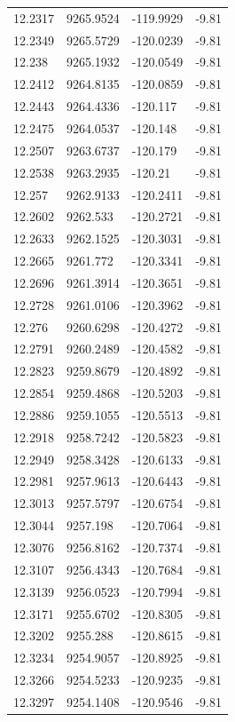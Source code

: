 \begin{table}[H]
\begin{tabular}{llll}
12.2317 & 9265.9524 & -119.9929 & -9.81 \\
12.2349 & 9265.5729 & -120.0239 & -9.81 \\
12.238 & 9265.1932 & -120.0549 & -9.81 \\
12.2412 & 9264.8135 & -120.0859 & -9.81 \\
12.2443 & 9264.4336 & -120.117 & -9.81 \\
12.2475 & 9264.0537 & -120.148 & -9.81 \\
12.2507 & 9263.6737 & -120.179 & -9.81 \\
12.2538 & 9263.2935 & -120.21 & -9.81 \\
12.257 & 9262.9133 & -120.2411 & -9.81 \\
12.2602 & 9262.533 & -120.2721 & -9.81 \\
12.2633 & 9262.1525 & -120.3031 & -9.81 \\
12.2665 & 9261.772 & -120.3341 & -9.81 \\
12.2696 & 9261.3914 & -120.3651 & -9.81 \\
12.2728 & 9261.0106 & -120.3962 & -9.81 \\
12.276 & 9260.6298 & -120.4272 & -9.81 \\
12.2791 & 9260.2489 & -120.4582 & -9.81 \\
12.2823 & 9259.8679 & -120.4892 & -9.81 \\
12.2854 & 9259.4868 & -120.5203 & -9.81 \\
12.2886 & 9259.1055 & -120.5513 & -9.81 \\
12.2918 & 9258.7242 & -120.5823 & -9.81 \\
12.2949 & 9258.3428 & -120.6133 & -9.81 \\
12.2981 & 9257.9613 & -120.6443 & -9.81 \\
12.3013 & 9257.5797 & -120.6754 & -9.81 \\
12.3044 & 9257.198 & -120.7064 & -9.81 \\
12.3076 & 9256.8162 & -120.7374 & -9.81 \\
12.3107 & 9256.4343 & -120.7684 & -9.81 \\
12.3139 & 9256.0523 & -120.7994 & -9.81 \\
12.3171 & 9255.6702 & -120.8305 & -9.81 \\
12.3202 & 9255.288 & -120.8615 & -9.81 \\
12.3234 & 9254.9057 & -120.8925 & -9.81 \\
12.3266 & 9254.5233 & -120.9235 & -9.81 \\
12.3297 & 9254.1408 & -120.9546 & -9.81 \\

\end{tabular}
\end{table}
